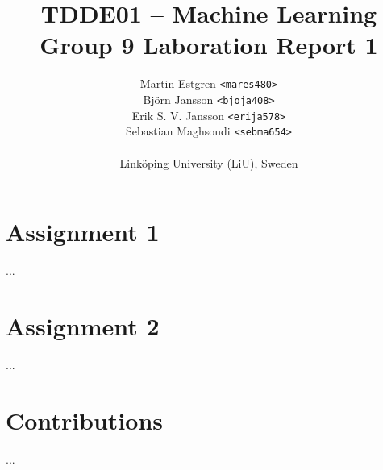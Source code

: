\documentclass[a4paper, twocolumn]{article}
\title{TDDE01 -- Machine Learning \\
       Group 9 Laboration Report 1}
\author{{Martin Estgren \texttt{<mares480>}} \\
        {Björn Jansson \texttt{<bjoja408>}} \\
        {Erik S. V. Jansson \texttt{<erija578>}} \\
        {Sebastian Maghsoudi \texttt{<sebma654>}} \\~\\
        {Linköping University (LiU), Sweden}}
\begin{document}
    \maketitle %

    \section*{Assignment 1}

    ...

    \section*{Assignment 2}

    ...

    \section*{Contributions}

    ...

    \nocite{*} %
    
    
\end{document}
